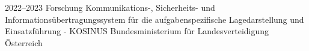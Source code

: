 \cventry
{2022--2023}
{Forschung}
{Kommunikations-, Sicherheits- und Informationsübertragungssystem für die aufgabenspezifische Lagedarstellung und Einsatzführung - KOSINUS}
{Bundesministerium für Landesverteidigung}
{Österreich}
{
}
